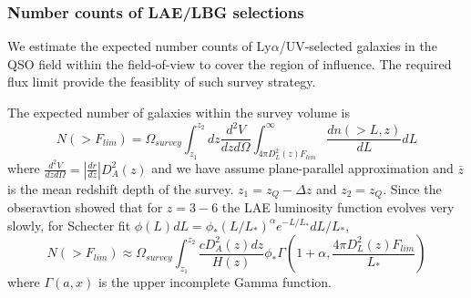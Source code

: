 \documentclass[useAMS,usenatbib,twocolumn]{mn2e}
\newcommand{\LyA}{\mbox{Ly}\alpha}
\begin{document}
\subsubsection{Number counts of LAE/LBG selections}

We estimate the expected number counts of $\LyA$/UV-selected galaxies 
in the QSO field within the field-of-view to cover the region of influence.
The required flux limit provide the feasiblity of such survey strategy. 

The expected number of galaxies within the survey volume is
\begin{equation}
N(>F_{lim})=\Omega_{survey}\int_{z_1}^{z_2} dz\frac{d^2V}{dzd\Omega}\int_{4\pi D_L^2(z)F_{lim}}^\infty
\frac{dn(>L,z)}{dL}dL
\end{equation}
where $\frac{d^2V}{dzd\Omega}=\left|\frac{dr}{dz}\right|D_A^2(z)$ and
we have assume plane-parallel approximation and $\bar{z}$ is the mean
redshift depth of the survey. $z_1=z_Q-\Delta z$ and $z_2=z_Q$. Since the obseravtion
showed that for $z=3-6$ the LAE luminosity function evolves very slowly,
for Schecter fit $\phi(L)dL=\phi_\ast(L/L_\ast)^{\alpha}e^{-L/L_\ast}dL/L_\ast$,
\begin{equation}
N(>F_{lim})\approx\Omega_{survey}
\int_{z_1}^{z_2}\frac{cD_A^2(z)dz}{H(z)}
\phi_\ast \Gamma\left(1+\alpha,\frac{4\pi D_L^2(z)F_{lim}}{L_\ast}\right)
\end{equation}
where $\Gamma(a,x)$ is the upper incomplete Gamma function.
\end{document}
